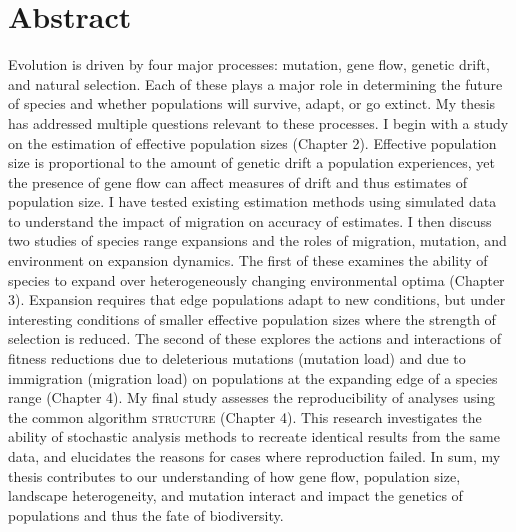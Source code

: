 \chapter*{Abstract}

Evolution is driven by four major processes: mutation, gene flow, genetic drift, and natural selection. Each of these plays a major role in determining the future of species and whether populations will survive, adapt, or go extinct. My thesis has addressed multiple questions relevant to these processes. I begin with a study on the estimation of effective population sizes (Chapter 2). Effective population size is proportional to the amount of genetic drift a population experiences, yet the presence of gene flow can affect measures of drift and thus estimates of population size. I have tested existing estimation methods using simulated data to understand the impact of migration on accuracy of estimates. I then discuss two studies of species range expansions and the roles of migration, mutation, and environment on expansion dynamics. The first of these examines the ability of species to expand over heterogeneously changing environmental optima (Chapter 3). Expansion requires that edge populations adapt to new conditions, but under interesting conditions of smaller effective population sizes where the strength of selection is reduced. The second of these explores the actions and interactions of fitness reductions due to deleterious mutations (mutation load) and due to immigration (migration load) on populations at the expanding edge of a species range (Chapter 4). My final study assesses the reproducibility of analyses using the common algorithm \textsc{structure} (Chapter 4). This research investigates the ability of stochastic analysis methods to recreate identical results from the same data, and elucidates the reasons for cases where reproduction failed. In sum, my thesis contributes to our understanding of how gene flow, population size, landscape heterogeneity, and mutation interact and impact the genetics of populations and thus the fate of biodiversity.

